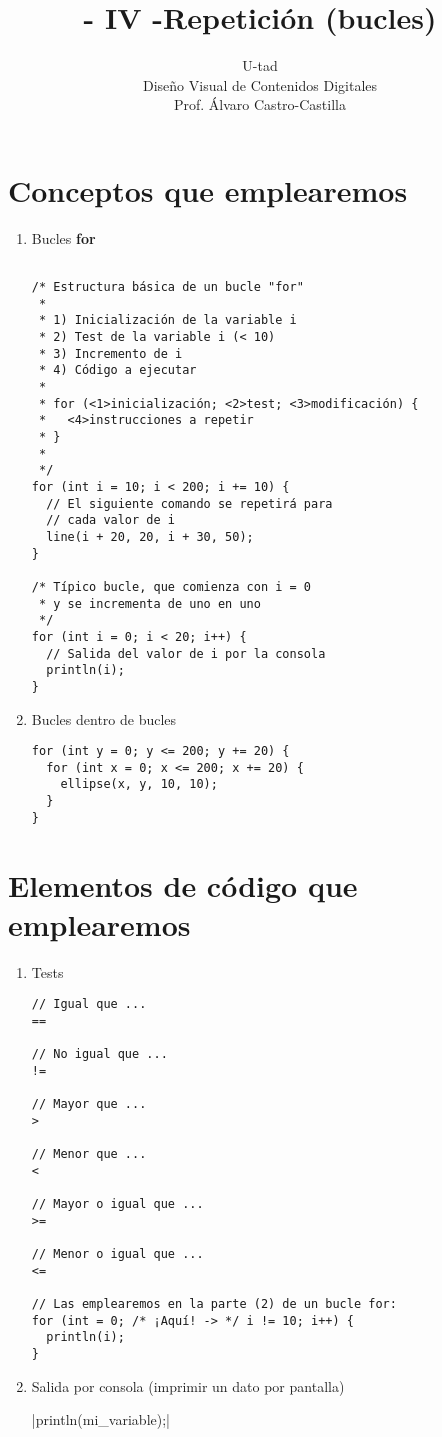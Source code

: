 \documentclass[a4paper,oneside]{article}
\title{- IV -\linebreak Repetición (bucles)}
\author{U-tad\\ Diseño Visual de Contenidos Digitales\\ Prof. Álvaro Castro-Castilla}
\date{}
\begin{document}
\maketitle


\section{Conceptos que emplearemos}
\begin{enumerate}
  \item Bucles \textbf{for}

    \begin{verbatim}
      
/* Estructura básica de un bucle "for"
 *
 * 1) Inicialización de la variable i
 * 2) Test de la variable i (< 10)
 * 3) Incremento de i
 * 4) Código a ejecutar
 * 
 * for (<1>inicialización; <2>test; <3>modificación) {
 *   <4>instrucciones a repetir
 * }
 *
 */
for (int i = 10; i < 200; i += 10) {
  // El siguiente comando se repetirá para
  // cada valor de i
  line(i + 20, 20, i + 30, 50);
}

/* Típico bucle, que comienza con i = 0
 * y se incrementa de uno en uno
 */
for (int i = 0; i < 20; i++) {
  // Salida del valor de i por la consola
  println(i);
}
    \end{verbatim}

  \item Bucles dentro de bucles

    \begin{verbatim}
for (int y = 0; y <= 200; y += 20) {
  for (int x = 0; x <= 200; x += 20) {
    ellipse(x, y, 10, 10);
  }
}
    \end{verbatim}
      
\end{enumerate}


\section{Elementos de código que emplearemos}
\begin{enumerate}
  \item Tests

    \begin{verbatim}
// Igual que ...
==

// No igual que ...
!=

// Mayor que ...
> 

// Menor que ...
< 

// Mayor o igual que ...
>=  

// Menor o igual que ...
<=  

// Las emplearemos en la parte (2) de un bucle for:
for (int = 0; /* ¡Aquí! -> */ i != 10; i++) {
  println(i);
}
    \end{verbatim}
  \item Salida por consola (imprimir un dato por pantalla)

     |println(mi_variable);|
\end{enumerate}
\end{document}

